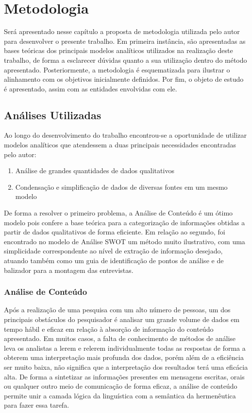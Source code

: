
\chapter{Metodologia}

Será apresentado nesse capítulo a proposta de metodologia utilizada pelo autor para desenvolver o presente trabalho. Em primeira instância, são apresentadas as bases teóricas dos principais modelos analíticos utilizados na realização deste trabalho, de forma a esclarecer dúvidas quanto a sua utilização dentro do método apresentado. Posteriormente, a metodologia é esquematizada para ilustrar o alinhamento com os objetivos inicialmente definidos. Por fim, o objeto de estudo é apresentado, assim com as entidades envolvidas com ele.

\section{Análises Utilizadas}

Ao longo do desenvolvimento do trabalho encontrou-se a oportunidade de utilizar modelos analíticos que atendessem a duas principais necessidades encontradas pelo autor: 

\begin{enumerate}
\item Análise de grandes quantidades de dados qualitativos
\item Condensação e simplificação de dados de diversas fontes em um mesmo modelo
\end{enumerate} 

De forma a resolver o primeiro problema, a Análise de Conteúdo é um ótimo modelo pois confere a base teórica para a categorização de informações obtidas a partir de dados qualitativos de forma eficiente. Em relação ao segundo, foi encontrado no modelo de Análise SWOT um método muito ilustrativo, com uma simplicidade correspondente ao nível de extração de informação desejado, atuando também como um guia de identificação de pontos de análise e de balizador para a montagem das entrevistas.

\subsection{Análise de Conteúdo}
\label{cha:analise_conteudo}

Após a realização de uma pesquisa com um alto número de pessoas, um dos principais obstáculos do pesquisador é analisar um grande volume de dados em tempo hábil e eficaz em relação à absorção de informação do conteúdo apresentado. Em muitos casos, a falta de conhecimento de métodos de análise leva os analistas a lerem e relerem individualmente todas as respostas de forma a obterem uma interpretação mais profunda dos dados, porém além de a eficiência ser muito baixa, não significa que a interpretação dos resultados terá uma eficácia alta. De forma a sintetizar as informações presentes em mensagens escritas, orais ou qualquer outro meio de comunicação de forma eficaz, a análise de conteúdo permite unir a camada lógica da linguística com a semântica da hermenêutica para fazer essa tarefa.

